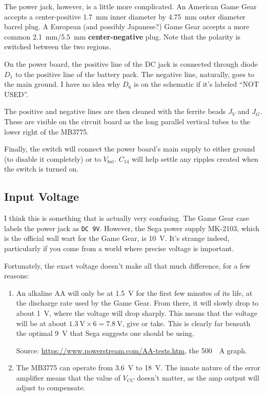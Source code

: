 \documentclass{article}
\newcommand{\Vbat}{$V_{bat}$}
\begin{document}
The power jack, however, is a little more complicated. An American
Game Gear accepts a center-positive \qty{1.7}{\milli\meter} inner
diameter by \qty{4.75}{\milli\meter} outer diameter barrel plug. A
European (and possibly Japanese?) Game Gear accepts a more common
\qty{2.1}{\milli\meter}/\qty{5.5}{\milli\meter}
\textbf{center-negative} plug. Note that the polarity is switched
between the two regions.

On the power board, the positive line of the DC jack is connected
through diode $D_1$ to the positive line of the battery pack. The
negative line, naturally, goes to the main ground. I have no idea why
$D_6$ is on the schematic if it's labeled ``NOT USED''.

The positive and negative lines are then cleaned with the ferrite
beads $J_V$ and $J_G$. These are visible on the circuit board as the
long parallel vertical tubes to the lower right of the MB3775.

Finally, the switch will connect the power board's main supply to
either ground (to disable it completely) or to \Vbat{}. $C_{14}$ will
help settle any ripples created when the switch is turned on.

\subsection{Input Voltage}
I think this is something that is actually very confusing. The Game
Gear case labels the power jack as \texttt{DC 9V}. However, the Sega
power supply MK-2103, which is the official wall wart for the Game
Gear, is \qty{10}{\volt}. It's strange indeed, particularly if you
come from a world where precise voltage is important.

Fortunately, the exact voltage doesn't make all that much
difference, for a few reasons:

\begin{enumerate}
\item An alkaline AA will only be at \qty{1.5}{\volt} for the first
  few minutes of its life, at the discharge rate used by the Game
  Gear. From there, it will slowly drop to about \qty{1}{\volt}, where
  the voltage will drop sharply. This means that the voltage will be
  at about $\qty{1.3}{\volt} \times{} 6 = \qty{7.8}{\volt}$, give or
  take. This is clearly far beneath the optimal \qty{9}{\volt} that
  Sega suggests one should be using.

  Source: \url{https://www.powerstream.com/AA-tests.htm}, the
  \qty{500}{\milli{}A} graph.
\item The MB3775 can operate from \qty{3.6}{\volt} to
  \qty{18}{\volt}. The innate nature of the error amplifier means that
  the value of $V_{CC}$ doesn't matter, as the amp output will adjust
  to compensate.
\end{enumerate}
\end{document}
